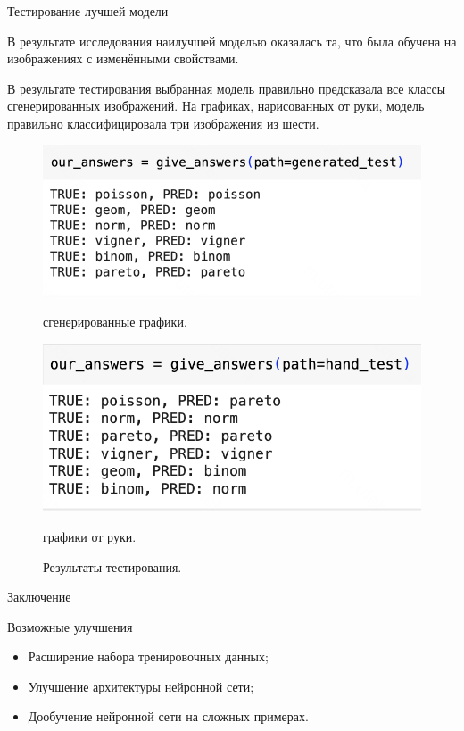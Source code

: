 \documentclass{beamer}
\begin{document}
\begin{frame}{Тестирование лучшей модели}

В результате исследования наилучшей моделью оказалась та, что была обучена на изображениях с изменёнными свойствами.

В результате тестирования выбранная модель правильно предсказала все классы сгенерированных изображений. На графиках, нарисованных от руки, модель правильно классифицировала три изображения из шести. 

\begin{figure}[H]
	\centering
	\begin{minipage}[t]{.45\textwidth}
		\centering
		\includegraphics[width=0.7\linewidth]{./img/gen_res.png}
		\caption*{сгенерированные графики.}
	\end{minipage}
	\noindent
	\begin{minipage}[t]{.45\textwidth}
		\centering
		\includegraphics[width=0.7\linewidth]{./img/hand_res.png}
		\caption*{графики от руки.}
	\end{minipage}
	\caption{Результаты тестирования.}
	\label{fig:hand2}
\end{figure}

\end{frame}


\begin{frame}{Заключение}
  \begin{alertblock}{Возможные улучшения}
  \begin{itemize}
    \item Расширение набора тренировочных данных; 
    \item Улучшение архитектуры нейронной сети; 
    \item Дообучение нейронной сети на сложных примерах.
  \end{itemize}
  \end{alertblock}
\end{frame}
\end{document}
